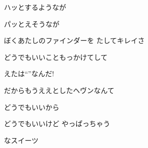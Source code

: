 \documentclass[a4paper,tate,twocolumn,12pt]{ltjtarticle}
\begin{document}
\begin{flushleft}
\vspace{2em}

\noindent\begin{minipage}{\linewidth}
ハッとするようなが

パッとえそうなが

ぼくあたしのファインダーを たしてキレイさ
\end{minipage}

\vspace{2em}

\noindent\begin{minipage}{\linewidth}
どうでもいいこともっかけてして

えたは“”なんだ!

だからもうええとしたヘヴンなんて

どうでもいいから
\end{minipage}

\vspace{2em}

\noindent\begin{minipage}{\linewidth}
どうでもいいけど やっぱっちゃう

なスイーツ
\end{minipage}

\end{flushleft}
\end{document}
